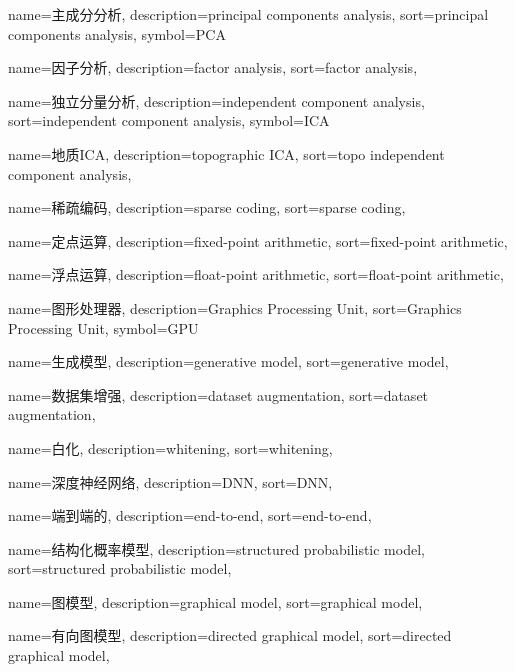 {
  name=主成分分析,
  description={principal components analysis},
  sort={principal components analysis},
  symbol={PCA}
}

{
  name=因子分析,
  description={factor analysis},
  sort={factor analysis},
}

{
  name=独立分量分析,
  description={independent component analysis},
  sort={independent component analysis},
  symbol={ICA}
}

{
  name=地质ICA,
  description={topographic ICA},
  sort={topo independent component analysis},
}

{
  name=稀疏编码,
  description={sparse coding},
  sort={sparse coding},
}

{
  name=定点运算,
  description={fixed-point arithmetic},
  sort={fixed-point arithmetic},
}

{
  name=浮点运算,
  description={float-point arithmetic},
  sort={float-point arithmetic},
}

{
  name=图形处理器,
  description={Graphics Processing Unit},
  sort={Graphics Processing Unit},
  symbol={GPU}
}

{
  name=生成模型,
  description={generative model},
  sort={generative model},
}

{
  name=数据集增强,
  description={dataset augmentation},
  sort={dataset augmentation},
}

{
  name=白化,
  description={whitening},
  sort={whitening},
}

{
  name=深度神经网络,
  description={DNN},
  sort={DNN},
}

{
  name=端到端的,
  description={end-to-end},
  sort={end-to-end},
}

{
  name=结构化概率模型,
  description={structured probabilistic model},
  sort={structured probabilistic model},
}

{
  name=图模型,
  description={graphical model},
  sort={graphical model},
}

{
  name=有向图模型,
  description={directed graphical model},
  sort={directed graphical model},
}

